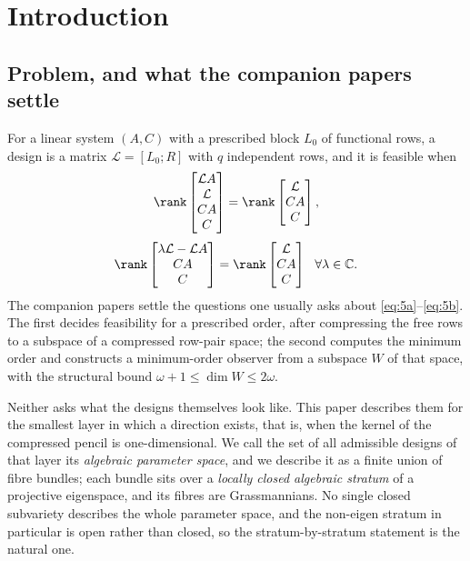 ﻿\section{Introduction}\label{sec:intro}

\subsection{Problem, and what the companion papers settle}\label{sec:intro:problem}

For a linear system $(A,C)$ with a prescribed block $L_0$ of functional rows, a design is a matrix
$\mathcal L=[L_0;R]$ with $q$ independent rows, and it is feasible when
\begin{equation}\label{eq:5a}
\rank\begin{bmatrix}\mathcal LA\\ \mathcal L\\ CA\\ C\end{bmatrix}
=\rank\begin{bmatrix}\mathcal L\\ CA\\ C\end{bmatrix},
\end{equation}
\begin{equation}\label{eq:5b}
\rank\begin{bmatrix}\lambda\mathcal L-\mathcal LA\\ CA\\ C\end{bmatrix}
=\rank\begin{bmatrix}\mathcal L\\ CA\\ C\end{bmatrix}\ \ \forall\lambda\in\mathbb C .
\end{equation}
The companion papers settle the questions one usually asks about \eqref{eq:5a}--\eqref{eq:5b}. The
first \cite{companion1} decides feasibility for a prescribed order, after compressing the free rows to
a subspace of a compressed row-pair space; the second \cite{companion2} computes the minimum order and
constructs a minimum-order observer from a subspace $W$ of that space, with the structural bound
$\omega+1\le\dim W\le 2\omega$.

Neither asks what the designs themselves look like. This paper describes them for the smallest layer
in which a direction exists, that is, when the kernel of the compressed pencil is one-dimensional. We
call the set of all admissible designs of that layer its \emph{algebraic parameter space}, and we
describe it as a finite union of fibre bundles; each bundle sits over a \emph{locally closed algebraic
stratum} of a projective eigenspace, and its fibres are Grassmannians. No single closed subvariety
describes the whole parameter space, and the non-eigen stratum in particular is open rather than
closed, so the stratum-by-stratum statement is the natural one.


